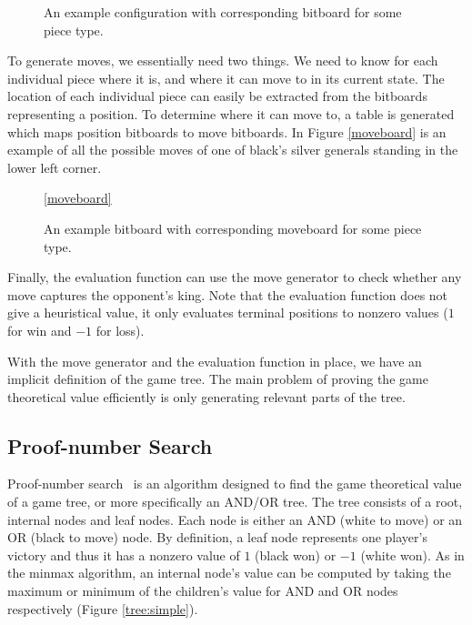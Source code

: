 \documentclass{article}
\begin{document}
\begin{figure}[h]
\center
\caption{An example configuration with corresponding bitboard for some piece type.}
\label{bitboard}
\end{figure}

To generate moves, we essentially need two things. We need to know for each individual piece where it is, and where it can move to in its current state.
The location of each individual piece can easily be extracted from the bitboards representing a position. To determine where it can move to, a table
is generated which maps position bitboards to move bitboards. In Figure \ref{moveboard} is an example of all the possible moves of one of black's silver
generals standing in the lower left corner.

\begin{figure}[h]
\center
\caption{An example bitboard with corresponding moveboard for some piece type.}
\ref{moveboard}
\end{figure}

Finally, the evaluation function can use the move generator to check whether any move captures the opponent's king. Note that the evaluation function
does not give a heuristical value, it only evaluates terminal positions to nonzero values ($1$ for win and $-1$ for loss).

With the move generator and the evaluation function in place, we have an implicit definition of the game tree. The main problem of proving the game
theoretical value efficiently is only generating relevant parts of the tree.

\subsection{Proof-number Search}
\label{pnsearch}
Proof-number search~\cite{allis1994proof} is an algorithm designed to find the game theoretical value of a game tree, or more specifically an AND/OR tree.
The tree consists of a root, internal nodes and leaf nodes. Each node is either an AND (white to move) or an OR (black to move) node. By definition, a leaf
node represents one player's victory and thus it has a nonzero value of $1$ (black won) or $-1$ (white won). As in the minmax algorithm, an internal
node's value can be computed by taking the maximum or minimum of the children's value for AND and OR nodes respectively (Figure \ref{tree:simple}).
\end{document}
